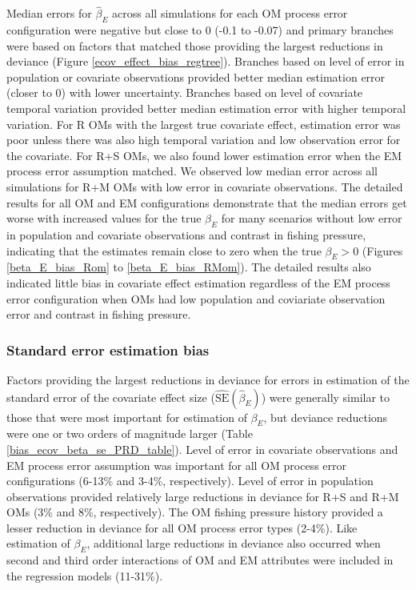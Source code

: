 \documentclass[
  12pt,
]{article}
\begin{document}
Median errors for \(\widehat \beta_E\) across all simulations for each OM process error configuration were negative but close to 0 (-0.1 to -0.07) and primary branches were based on factors that matched those providing the largest reductions in deviance (Figure \ref{ecov_effect_bias_regtree}). Branches based on level of error in population or covariate observations provided better median estimation error (closer to 0) with lower uncertainty. Branches based on level of covariate temporal variation provided better median estimation error with higher temporal variation. For R OMs with the largest true covariate effect, estimation error was poor unless there was also high temporal variation and low observation error for the covariate. For R+S OMs, we also found lower estimation error when the EM process error assumption matched. We observed low median error across all simulations for R+M OMs with low error in covariate observations. The detailed results for all OM and EM configurations demonstrate that the median errors get worse with increased values for the true \(\beta_E\) for many scenarios without low error in population and covariate observations and contrast in fishing pressure, indicating that the estimates remain close to zero when the true \(\beta_E>0\) (Figures \ref{beta_E_bias_Rom} to \ref{beta_E_bias_RMom}). The detailed results also indicated little bias in covariate effect estimation regardless of the EM process error configuration when OMs had low population and coviariate observation error and contrast in fishing pressure.

\subsubsection*{Standard error estimation bias}\label{standard-error-estimation-bias}

Factors providing the largest reductions in deviance for errors in estimation of the standard error of the covariate effect size (\(\widehat {\text{SE}}\left(\widehat\beta_E\right)\)) were generally similar to those that were most important for estimation of \(\beta_E\), but deviance reductions were one or two orders of magnitude larger (Table \ref{bias_ecov_beta_se_PRD_table}). Level of error in covariate observations and EM process error assumption was important for all OM process error configurations (6-13\% and 3-4\%, respectively). Level of error in population observations provided relatively large reductions in deviance for R+S and R+M OMs (3\% and 8\%, respectively). The OM fishing pressure history provided a lesser reduction in deviance for all OM process error types (2-4\%). Like estimation of \(\beta_E\), additional large reductions in deviance also occurred when second and third order interactions of OM and EM attributes were included in the regression models (11-31\%).
\end{document}
